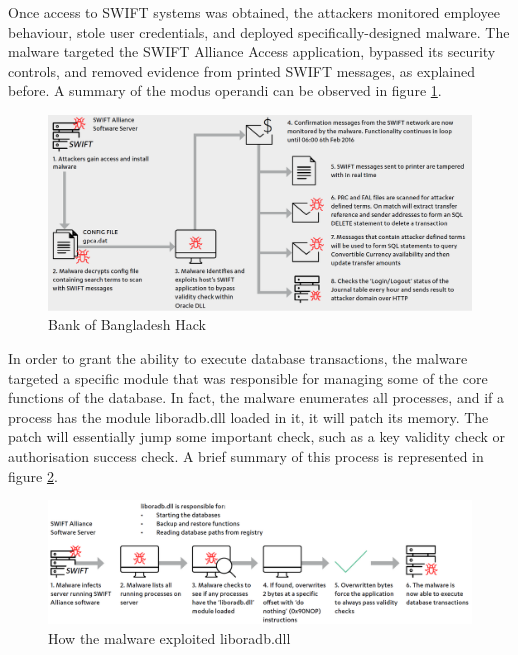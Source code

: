 \documentclass[12pt]{article}
\begin{document}
        Once access to SWIFT systems was obtained, the attackers monitored employee behaviour, stole user credentials, and deployed specifically-designed malware. The malware targeted the SWIFT Alliance Access application, bypassed its security controls, and removed evidence from printed SWIFT messages, as explained before. A summary of the modus operandi can be observed in figure \ref{fig:Bangladesh}.
        
        \begin{figure}[H]
        \centering
        \includegraphics[width=\textwidth,cfbox=red 0.1mm 0.1mm]{figures/Bangladesh.png}
        \caption{Bank of Bangladesh Hack}
        \label{fig:Bangladesh}
        \end{figure}
        
        In order to grant the ability to execute database transactions, the malware targeted a specific module that was responsible for managing some of the core functions of the database. In fact, the malware enumerates all processes, and if a process has the module liboradb.dll loaded in it, it will patch its memory. The patch will essentially jump some important check, such as a key validity check or authorisation success check. A brief summary of this process is represented in figure \ref{fig:liboradb}.
        
        \begin{figure}[H]
        \centering
        \includegraphics[width=\textwidth]{figures/liboradb.png}
        \caption{How the malware exploited liboradb.dll}
        \label{fig:liboradb}
        \end{figure}
        
\end{document}
